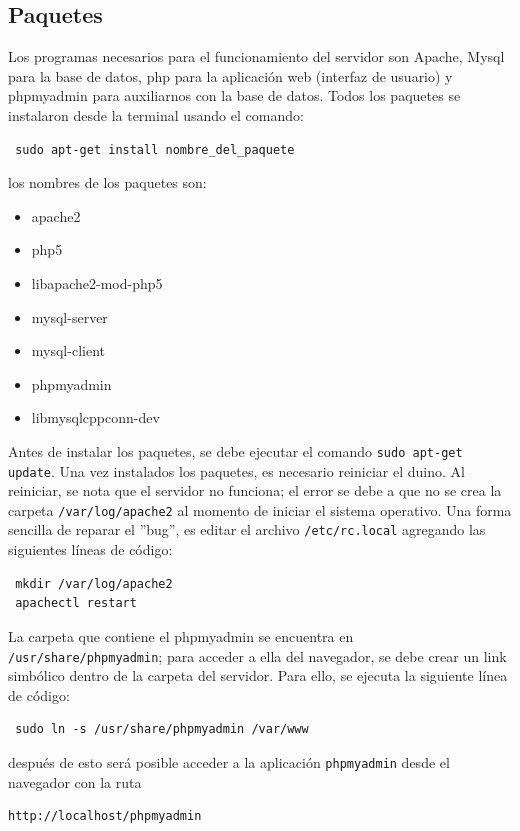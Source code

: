 \documentclass[a4paper,10pt,titlepage]{article}
\begin{document}
\subsection{Paquetes}
Los programas necesarios 
para el funcionamiento del servidor son Apache, Mysql para la base de datos, 
php para la aplicaci\'on web (interfaz de usuario) y phpmyadmin para auxiliarnos con la base de 
datos. 
Todos los paquetes se instalaron desde la terminal usando el comando:
\begin{verbatim}
 sudo apt-get install nombre_del_paquete
\end{verbatim}
los nombres de los paquetes son:
\begin{itemize}
\item apache2
\item php5
\item libapache2-mod-php5
\item mysql-server 
\item mysql-client
\item phpmyadmin 
\item libmysqlcppconn-dev 
\end{itemize}

Antes de instalar los paquetes, se debe ejecutar el comando \verb|sudo apt-get update|. Una vez instalados los paquetes, es necesario reiniciar el duino. Al reiniciar, se 
nota que el servidor no 
funciona; el error se debe a que no se crea la carpeta \verb|/var/log/apache2| al momento 
de iniciar el sistema operativo. Una forma sencilla de reparar el ''bug'', es editar el archivo \verb|/etc/rc.local| 
agregando las siguientes l\'ineas de c\'odigo:

\begin{verbatim}
 mkdir /var/log/apache2
 apachectl restart
\end{verbatim}

La carpeta que contiene el 
phpmyadmin se encuentra en \verb|/usr/share/phpmyadmin|; para acceder a ella del navegador, se debe 
crear un link simb\'olico dentro de la carpeta del servidor. Para ello, se ejecuta la 
siguiente l\'inea 
de c\'odigo:
\begin{verbatim}
 sudo ln -s /usr/share/phpmyadmin /var/www
\end{verbatim}

despu\'es de esto ser\'a posible acceder a la aplicaci\'on \verb|phpmyadmin| desde el navegador con la ruta

\begin{verbatim}
http://localhost/phpmyadmin
\end{verbatim}
\end{document}
